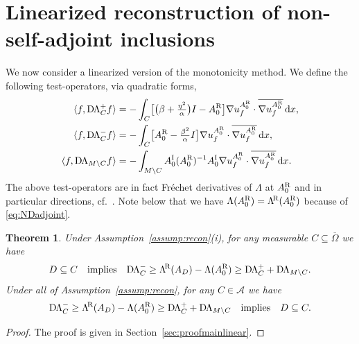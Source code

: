 \documentclass[reqno]{amsart}
\numberwithin{equation}{section}
\numberwithin{figure}{section}
\numberwithin{table}{section}
\theoremstyle{plain}
\newtheorem{theorem}{Theorem}[section]
\theoremstyle{definition}
\theoremstyle{remark}
\newcommand{\inner}[1]{\langle#1\rangle}
\newcommand{\di}{\mathrm{d}}   %
\newcommand{\upR}{^{\textup{R}}}
\newcommand{\upI}{^{\textup{I}}}
\newcommand{\uptR}{^{\!\textup{R}}}
\newcommand{\LambdaR}{\Lambda\uptR}
\newcommand{\AR}{A\upR}
\newcommand{\AI}{A\upI}
\newcommand{\DLambda}{\textup{D}\mkern-1.5mu \Lambda}
\begin{document}
	\section{Linearized reconstruction of non-self-adjoint inclusions} \label{sec:rec}
	
	We now consider a linearized version of the monotonicity method. We define the following test-operators, via quadratic forms,
	\begin{align*}
		\inner{f,\DLambda_C^+ f} &= -\int_C \bigl[\bigl(\beta + \tfrac{\eta^2}{\alpha}\bigr)I-\AR_0\bigr]\nabla u_f^{\AR_0}\cdot\overline{\nabla u_f^{\AR_0}}\,\di x, \\
		\inner{f,\DLambda_C^- f} &= -\int_C \bigl[\AR_0 - \tfrac{\beta^2}{\alpha}I\bigr]\nabla u_f^{\AR_0}\cdot\overline{\nabla u_f^{\AR_0}}\,\di x, \\
		\inner{f, \DLambda_{M\setminus C} f} &= -\int_{M\setminus C} \AI_0(\AR_0)^{-1}\AI_0\nabla u_f^{\AR_0}\cdot\overline{\nabla u_f^{\AR_0}}\,\di x.
	\end{align*}
	The above test-operators are in fact Fr\'echet derivatives of $\Lambda$ at $\AR_0$ and in particular directions, cf.~\cite{Garde2022c}. Note below that we have $\Lambda(\AR_0) = \LambdaR(\AR_0)$ because of \eqref{eq:NDadjoint}.
	
	\begin{theorem} \label{thm:mainlinear}
		Under Assumption~\ref{assump:recon}(i), for any measurable $C\subseteq \overline{\Omega}$ we have
		\begin{equation*}
			D \subseteq C \quad \text{implies} \quad \DLambda^-_{C} \geq \LambdaR(A_D) - \Lambda(\AR_0) \geq \DLambda^+_{C}+\DLambda_{M\setminus C}.
		\end{equation*}
		Under all of Assumption~\ref{assump:recon}, for any $C\in\mathcal{A}$ we have
		\begin{equation*}
			 \DLambda^-_{C} \geq \LambdaR(A_D) - \Lambda(\AR_0) \geq \DLambda^+_{C}+\DLambda_{M\setminus C} \quad \text{implies} \quad D \subseteq C.
		\end{equation*}
	\end{theorem}
	\begin{proof}
		The proof is given in Section~\ref{sec:proofmainlinear}.
	\end{proof}
	
\end{document}
